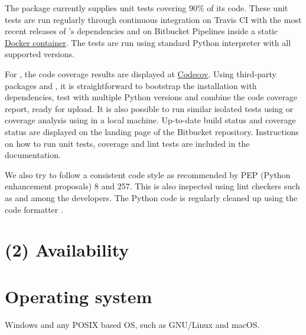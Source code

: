 
The package  currently supplies unit tests covering 90\% of its
code.  These unit tests are run regularly through continuous integration on Travis
CI with the most recent releases of 's dependencies and on
Bitbucket Pipelines inside a static
\href{https://hub.docker.com/u/fluiddyn}{Docker container}.  The tests are run
using standard Python interpreter with all supported versions.

For , the code coverage results are displayed at
\href{https://codecov.io/bb/fluiddyn/fluidfft}{Codecov}.  Using third-party
packages  and , it is straightforward to bootstrap the
installation with dependencies, test with multiple Python versions and combine the
code coverage report, ready for upload. It is also possible to run similar
isolated tests using  or coverage analysis using  in a
local machine.  Up-to-date build status and coverage status are displayed on the
landing page of the Bitbucket repository.  Instructions on how to run unit tests,
coverage and lint tests are included in the documentation.

We also try to follow a consistent code style as recommended by PEP (Python
enhancement proposals) 8 and 257. This is also inspected using lint checkers such
as  and  among the developers.  The Python
code is regularly cleaned up using the code formatter .


\section{(2) Availability}
\vspace{0.5cm}
\section{Operating system}


Windows and any POSIX based OS, such as GNU/Linux and macOS.

